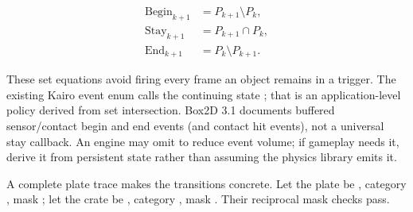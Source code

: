 \[
\begin{aligned}\mathrm{Begin}_{k+1} &= P_{k+1} \setminus P_k,\\\mathrm{Stay}_{k+1} &= P_{k+1} \cap P_k,\\\mathrm{End}_{k+1} &= P_k \setminus P_{k+1}.\end{aligned}
\]

These set equations avoid firing  every frame an object remains in a trigger. The existing Kairo event enum calls the continuing state ; that is an application-level policy derived from set intersection. Box2D 3.1 documents buffered sensor/contact begin and end events (and contact hit events), not a universal stay callback. An engine may omit  to reduce event volume; if gameplay needs it, derive it from persistent state rather than assuming the physics library emits it.

A complete plate trace makes the transitions concrete. Let the plate be , category , mask ; let the crate be , category , mask . Their reciprocal mask checks pass.

